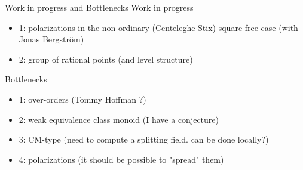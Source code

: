 \documentclass[usenames,dvipsnames]{beamer}
\begin{document}
\begin{frame}{Work in progress and Bottlenecks}{}
    Work in progress
	\begin{itemize}
	\item 1: polarizations in the non-ordinary (Centeleghe-Stix) square-free case (with Jonas Bergstr\"om)
	\item 2: group of rational points (and level structure)
	\end{itemize}
	\pause 
	Bottlenecks
	\begin{itemize}
	\item 1: over-orders (Tommy Hoffman ?)
	\item 2: weak equivalence class monoid (I have a conjecture)
	\item 3: CM-type (need to compute a splitting field. can be done locally?)
	\item 4: polarizations (it should be possible to "spread" them)
	\end{itemize}
\end{frame}
\end{document}
